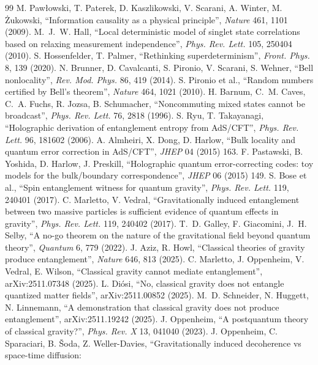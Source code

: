 \documentclass[11pt,a4paper]{article}
\theoremstyle{definition}
\theoremstyle{remark}
\begin{document}
\begin{thebibliography}{99}
 M. Paw{\l}owski, T. Paterek, D. Kaszlikowski, V. Scarani, A. Winter, M. \.{Z}ukowski, ``Information causality as a physical
principle'', \emph{Nature} 461, 1101 (2009).
 M.~J.~W. Hall, ``Local deterministic model of singlet state correlations based on relaxing measurement independence'',
\emph{Phys. Rev. Lett.} 105, 250404 (2010).
 S. Hossenfelder, T. Palmer, ``Rethinking superdeterminism'', \emph{Front. Phys.} 8, 139 (2020).
 N. Brunner, D. Cavalcanti, S. Pironio, V. Scarani, S. Wehner, ``Bell nonlocality'', \emph{Rev. Mod. Phys.} 86, 419 (2014).
 S. Pironio et al., ``Random numbers certified by Bell's theorem'', \emph{Nature} 464, 1021 (2010).
 H. Barnum, C.~M. Caves, C.~A. Fuchs, R. Jozsa, B. Schumacher, ``Noncommuting mixed states cannot be broadcast'',
\emph{Phys. Rev. Lett.} 76, 2818 (1996).
 S. Ryu, T. Takayanagi, ``Holographic derivation of entanglement entropy from AdS/CFT'', \emph{Phys. Rev. Lett.} 96, 181602
(2006).
 A. Almheiri, X. Dong, D. Harlow, ``Bulk locality and quantum error correction in AdS/CFT'', \emph{JHEP} 04 (2015) 163.
 F. Pastawski, B. Yoshida, D. Harlow, J. Preskill, ``Holographic quantum error-correcting codes: toy models for the
bulk/boundary correspondence'', \emph{JHEP} 06 (2015) 149.
 S. Bose et al., ``Spin entanglement witness for quantum gravity'', \emph{Phys. Rev. Lett.} 119, 240401 (2017).
 C. Marletto, V. Vedral, ``Gravitationally induced entanglement between two massive particles is sufficient evidence of
quantum effects in gravity'', \emph{Phys. Rev. Lett.} 119, 240402 (2017).
 T.~D. Galley, F. Giacomini, J.~H. Selby, ``A no-go theorem on the nature of the gravitational field beyond quantum
theory'', \emph{Quantum} 6, 779 (2022).
 J. Aziz, R. Howl, ``Classical theories of gravity produce entanglement'', \emph{Nature} 646, 813 (2025).
 C. Marletto, J. Oppenheim, V. Vedral, E. Wilson, ``Classical gravity cannot mediate entanglement'', arXiv:2511.07348
(2025).
 L. Di\'osi, ``No, classical gravity does not entangle quantized matter fields'', arXiv:2511.00852 (2025).
 M.~D. Schneider, N. Huggett, N. Linnemann, ``A demonstration that classical gravity does not produce entanglement'',
arXiv:2511.19242 (2025).
 J. Oppenheim, ``A postquantum theory of classical gravity?'', \emph{Phys. Rev. X} 13, 041040 (2023).
 J. Oppenheim, C. Sparaciari, B. \v{S}oda, Z. Weller-Davies, ``Gravitationally induced decoherence vs space-time diffusion:

\end{thebibliography}
\end{document}
